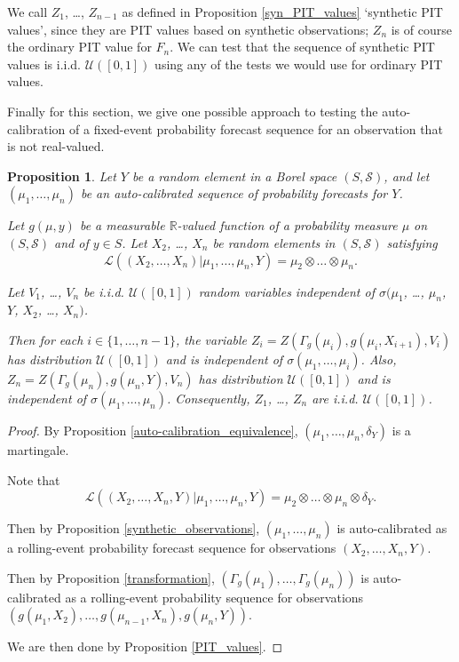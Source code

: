 \documentclass[aap]{imsart}
\theoremstyle{plain}
\newtheorem{proposition}[theorem]{Proposition}
\theoremstyle{definition}
\begin{document}
We call $Z_1$, \ldots, $Z_{n-1}$ as defined in Proposition \ref{syn_PIT_values} `synthetic PIT values', since they are PIT values based on synthetic observations; $Z_n$ is of course the ordinary PIT value for $F_n$. We can test that the sequence of synthetic PIT values is i.i.d. $\mathcal{U}([0,1])$ using any of the tests we would use for ordinary PIT values.

Finally for this section, we give one possible approach to testing the auto-calibration of a fixed-event probability forecast sequence for an observation that is not real-valued.

\begin{proposition}
Let $Y$ be a random element in a Borel space $(S, \mathcal{S})$, and let $(\mu_1, \ldots, \mu_n)$ be an auto-calibrated sequence of probability forecasts for $Y$.

  Let $g(\mu,y)$ be a measurable $\mathbb{R}$-valued function of a probability measure $\mu$ on $(S, \mathcal{S})$ and of $y \in S$. Let $X_2$, \ldots, $X_n$ be random elements in $(S, \mathcal{S})$ satisfying
\begin{equation*}
  \mathcal{L}((X_2, \ldots, X_n)|\mu_1, \ldots, \mu_n, Y) = \mu_2 \otimes \ldots \otimes \mu_n.
\end{equation*}

  Let $V_1$, \ldots, $V_n$ be i.i.d. $\mathcal{U}([0,1])$ random variables independent of $\sigma(\mu_1$, \ldots, $\mu_n$, $Y$, $X_2$, \ldots, $X_n)$.

  Then for each $i \in \{1, \ldots, n-1\}$, the variable $Z_i = Z(\Gamma_g(\mu_i), g(\mu_i, X_{i+1}), V_i)$ has distribution $\mathcal{U}([0,1])$ and is independent of $\sigma(\mu_1, \ldots, \mu_i)$. Also, $Z_n = Z(\Gamma_g(\mu_n), g(\mu_n,Y), V_n)$ has distribution $\mathcal{U}([0,1])$ and is independent of $\sigma(\mu_1, \ldots, \mu_n)$. Consequently, $Z_1$, \ldots, $Z_n$ are i.i.d. $\mathcal{U}([0,1])$.
\end{proposition}

\begin{proof}
  By Proposition \ref{auto-calibration_equivalence}, $(\mu_1, \ldots, \mu_n, \delta_Y)$ is a martingale.

  Note that
\begin{equation*}
\mathcal{L}((X_2, \ldots, X_n, Y)|\mu_1, \ldots, \mu_n, Y) = \mu_2 \otimes \ldots \otimes \mu_n \otimes \delta_Y.
\end{equation*}

  Then by Proposition \ref{synthetic_observations}, $(\mu_1, \ldots, \mu_n)$ is auto-calibrated as a rolling-event probability forecast sequence for observations $(X_2, \ldots, X_n, Y)$.

  Then by Proposition \ref{transformation}, $(\Gamma_g(\mu_1), \ldots, \Gamma_g(\mu_n))$ is auto-calibrated as a rolling-event probability sequence for observations $(g(\mu_1, X_2), \ldots, g(\mu_{n-1}, X_n), g(\mu_n, Y))$.

  We are then done by Proposition \ref{PIT_values}.
\end{proof}
\end{document}
